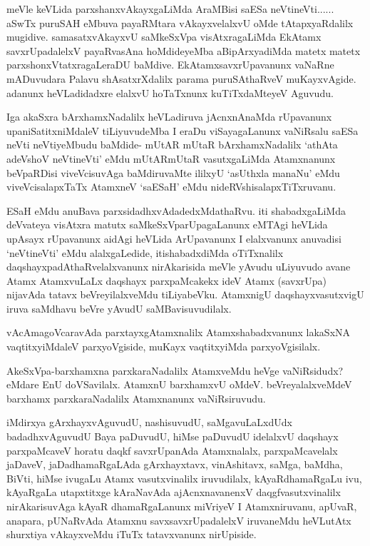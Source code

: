 \begin{artha}
meVle keVLida parxshanxvAkayxgaLiMda AraMBisi saESa neVtineVti...... aSwTx puruSAH eMbuva payaRMtara vAkayxvelalxvU oMde tAtapxyaRdalilx mugidive. samasatxvAkayxvU saMkeSxVpa visAtxragaLiMda EkAtamx savxrUpadalelxV payaRvasAna hoMdideyeMba aBipArxyadiMda matetx matetx parxshonxVtatxragaLeraDU baMdive. EkAtamxsavxrUpavanunx vaNaRne mADuvudara Palavu shAsatxrXdalilx parama puruSAthaRveV muKayxvAgide. adanunx heVLadidadxre elalxvU hoTaTxnunx kuTiTxdaMteyeV Aguvudu. 
\end{artha}

\begin{artha}
Iga akaSxra bArxhamxNadalilx heVLadiruva jAcnxnAnaMda rUpavanunx upaniSatitxniMdaleV tiLiyuvudeMba I eraDu viSayagaLanunx vaNiRsalu saESa neVti neVtiyeMbudu baMdide- mUtAR mUtaR bArxhamxNadalilx `athAta adeVshoV neVtineVti' eMdu mUtARmUtaR vasutxgaLiMda Atamxnanunx beVpaRDisi viveVcisuvAga baMdiruvaMte ililxyU `asUthxla manaNu' eMdu viveVcisalapxTaTx AtamxneV `saESaH' eMdu nideRVshisalapxTiTxruvanu. 
\end{artha}%


\begin{artha}
ESaH eMdu anuBava parxsidadhxvAdadedxMdathaRvu. iti shabadxgaLiMda deVvateya visAtxra matutx saMkeSxVparUpagaLanunx eMTAgi heVLida upAsayx rUpavanunx aidAgi heVLida ArUpavanunx I elalxvanunx anuvadisi `neVtineVti' eMdu alalxgaLedide, itishabadxdiMda oTiTxnalilx daqshayxpadAthaRvelalxvanunx nirAkarisida meVle yAvudu uLiyuvudo avane Atamx AtamxvuLaLx daqshayx parxpaMcakekx ideV Atamx (savxrUpa) nijavAda tatavx beVreyilalxveMdu tiLiyabeVku. AtamxnigU daqshayxvasutxvigU iruva saMdhavu beVre yAvudU saMBavisuvudilalx.
\end{artha}

\begin{artha}
vAcAmagoVcaravAda parxtayxgAtamxnalilx Atamxshabadxvanunx lakaSxNA vaqtitxyiMdaleV parxyoVgiside, muKayx vaqtitxyiMda parxyoVgisilalx. 
\end{artha}

\begin{artha}
AkeSxVpa-barxhamxna parxkaraNadalilx AtamxveMdu heVge vaNiRsidudx? eMdare EnU doVSavilalx. AtamxnU barxhamxvU oMdeV. beVreyalalxveMdeV barxhamx parxkaraNadalilx Atamxnanunx vaNiRsiruvudu. 
\end{artha}

\begin{artha}
iMdirxya gArxhayxvAguvudU, nashisuvudU, saMgavuLaLxdUdx badadhxvAguvudU Baya paDuvudU, hiMse paDuvudU idelalxvU daqshayx parxpaMcaveV horatu daqkf savxrUpanAda Atamxnalalx, parxpaMcavelalx jaDaveV, jaDadhamaRgaLAda gArxhayxtavx, vinAshitavx, saMga, baMdha, BiVti, hiMse ivugaLu Atamx vasutxvinalilx iruvudilalx, kAyaRdhamaRgaLu ivu, kAyaRgaLa utapxtitxge kAraNavAda ajAcnxnavanenxV daqgfvasutxvinalilx nirAkarisuvAga kAyaR dhamaRgaLanunx miVriyeV I Atamxniruvanu, apUvaR, anapara, pUNaRvAda Atamxnu savxsavxrUpadalelxV iruvaneMdu heVLutAtx shurxtiya vAkayxveMdu iTuTx tatavxvanunx nirUpiside. 
\end{artha}%

